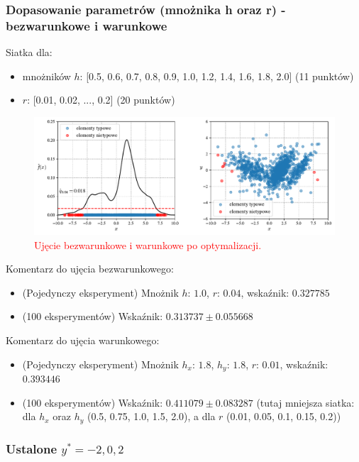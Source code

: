 \documentclass[12pt,a4paper,oneside]{book}
\theoremstyle{definition}
\begin{document}
\subsubsection*{Dopasowanie parametrów (mnożnika h oraz r) - bezwarunkowe i warunkowe}
Siatka dla:
\begin{itemize}
\item mnożników $h$: [0.5, 0.6, 0.7, 0.8, 0.9, 1.0, 1.2, 1.4, 1.6, 1.8, 2.0] (11 punktów)
\item $r$: [0.01, 0.02, ..., 0.2] (20 punktów)
\end{itemize} 
\begin{figure}[H]
    \centering
    \includegraphics[scale=0.6]{synthetic_data_outliers_kde_and_ckde2}
    \vspace{-0.5cm} 
    \caption{\textcolor{red}{Ujęcie bezwarunkowe i warunkowe po optymalizacji.}}
\end{figure}
Komentarz do ujęcia bezwarunkowego:
\begin{itemize}
\item (Pojedynczy eksperyment) Mnożnik $h$: $1.0$, $r$: $0.04$, wskaźnik: $0.327785$
\item (100 eksperymentów) Wskaźnik: $0.313737 \pm 0.055668$
\end{itemize}
Komentarz do ujęcia warunkowego:
\begin{itemize}
\item (Pojedynczy eksperyment) Mnożnik $h_x$: $1.8$, $h_y$: $1.8$, $r$: $0.01$, wskaźnik: $0.393446$
\item (100 eksperymentów) Wskaźnik: $0.411079 \pm 0.083287$ (tutaj mniejsza siatka: dla $h_x$ oraz $h_y$ (0.5, 0.75, 1.0, 1.5, 2.0), a dla $r$ (0.01, 0.05, 0.1, 0.15, 0.2))
\end{itemize}

\newpage
\subsubsection*{Ustalone $y^*=-2,0,2$}
\end{document}
